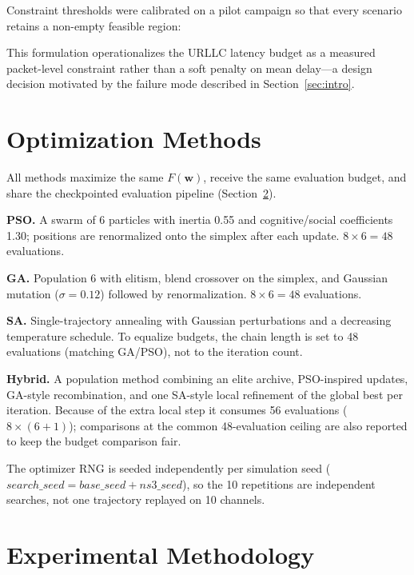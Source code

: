 \documentclass[conference]{IEEEtran}
\newif\ifdraftpending
\newcommand{\pending}[1]{%
  \ifdraftpending{\color{red}\textbf{[PENDING-v2: #1]}}\else{}\fi}
\begin{document}
Constraint thresholds were calibrated on a pilot campaign so that every
scenario retains a non-empty feasible region:
\pending{final calibrated $P^{\min}_U$, $P^{\min}_M$, $\phi$; pre-calibration
defaults 90\%, 80\%, 0.60. Report the calibration outcome here.}

This formulation operationalizes the URLLC latency budget as a measured
packet-level constraint rather than a soft penalty on mean delay---a design
decision motivated by the failure mode described in Section~\ref{sec:intro}.

\section{Optimization Methods}
All methods maximize the same $F(\mathbf{w})$, receive the same evaluation
budget, and share the checkpointed evaluation pipeline (Section~\ref{sec:campaign}).

\textbf{PSO.} A swarm of 6 particles with inertia 0.55 and cognitive/social
coefficients 1.30; positions are renormalized onto the simplex after each
update. $8 \times 6 = 48$ evaluations.

\textbf{GA.} Population 6 with elitism, blend crossover on the simplex, and
Gaussian mutation ($\sigma = 0.12$) followed by renormalization. $8 \times 6 =
48$ evaluations.

\textbf{SA.} Single-trajectory annealing with Gaussian perturbations and a
decreasing temperature schedule. To equalize budgets, the chain length is set
to 48 evaluations (matching GA/PSO), not to the iteration count.

\textbf{Hybrid.} A population method combining an elite archive, PSO-inspired
updates, GA-style recombination, and one SA-style local refinement of the
global best per iteration. Because of the extra local step it consumes 56
evaluations ($8 \times (6{+}1)$); comparisons at the common 48-evaluation
ceiling are also reported to keep the budget comparison fair.
\pending{verify both budget readings appear in the results tables.}

The optimizer RNG is seeded independently per simulation seed
($\mathit{search\_seed} = \mathit{base\_seed} + \mathit{ns3\_seed}$), so the 10
repetitions are independent searches, not one trajectory replayed on 10
channels.

\section{Experimental Methodology}\label{sec:campaign}
\end{document}
